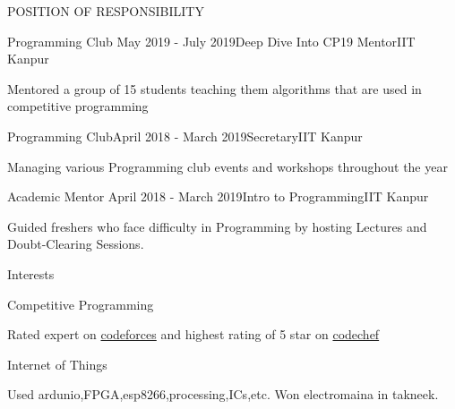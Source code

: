 \documentclass{resume}
\begin{document}
\begin{rSection}{POSITION OF RESPONSIBILITY}

\begin{rSubsection}{ Programming Club }{May 2019 - July 2019}{Deep Dive Into CP19 Mentor}{IIT Kanpur}
\item Mentored a group of 15 students teaching them algorithms that are used in competitive programming
\end{rSubsection}




\begin{rSubsection}{Programming Club}{April 2018 - March 2019}{Secretary}{IIT Kanpur}
\item Managing various Programming club events and workshops throughout the year
\end{rSubsection}


\begin{rSubsection}{ Academic Mentor }{April 2018 - March 2019}{Intro to Programming}{IIT Kanpur}
\item Guided freshers who face difficulty in Programming by hosting Lectures and Doubt-Clearing Sessions.
\end{rSubsection}

\end{rSection}

\begin{rSection}{Interests} \itemsep -3pt

\begin{rSubsection}{ Competitive Programming }{}{}{}
\item Rated expert on \href{https://codeforces.com/profile/Mrbinary10}{codeforces} and highest rating of 5 star on \href{https://codechef.com/users/subansal}{codechef}
\end{rSubsection}

\begin{rSubsection}{ Internet of Things }{}{}{}
\item Used ardunio,FPGA,esp8266,processing,ICs,etc. Won electromaina in takneek.
\end{rSubsection}

\end{rSection}
\end{document}
